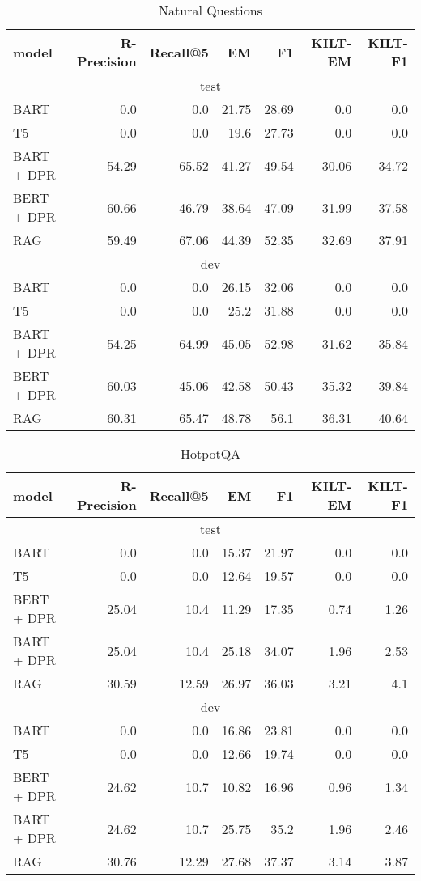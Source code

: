 \documentclass[11pt]{article}
\begin{document}
 \begin{table*}[ht]
\centering
\begin{tabular}{l@{\hskip 2em}rrrrrr}
 \toprule
model & \textbf{R-Precision} & \textbf{Recall@5} & \textbf{EM} & \textbf{F1}  & \textbf{KILT-EM}  & \textbf{KILT-F1}  \\
\midrule
\multicolumn{7}{c}{test} \\
\midrule
BART & 0.0 & 0.0 & 21.75 & 28.69 & 0.0 & 0.0 \\ 
T5 & 0.0 & 0.0 & 19.6 & 27.73 & 0.0 & 0.0 \\ 
BART + DPR & 54.29 & 65.52 & 41.27 & 49.54 & 30.06 & 34.72 \\ 
BERT + DPR & 60.66 & 46.79 & 38.64 & 47.09 & 31.99 & 37.58 \\ 
RAG & 59.49 & 67.06 & 44.39 & 52.35 & 32.69 & 37.91 \\  
\midrule
\multicolumn{7}{c}{dev} \\
\midrule
BART & 0.0 & 0.0 & 26.15 & 32.06 & 0.0 & 0.0 \\ 
T5 & 0.0 & 0.0 & 25.2 & 31.88 & 0.0 & 0.0 \\ 
BART + DPR & 54.25 & 64.99 & 45.05 & 52.98 & 31.62 & 35.84 \\ 
BERT + DPR & 60.03 & 45.06 & 42.58 & 50.43 & 35.32 & 39.84 \\ 
RAG & 60.31 & 65.47 & 48.78 & 56.1 & 36.31 & 40.64 \\  
\bottomrule
\end{tabular}
\caption{Natural Questions}
\label{tab:NQ}
\end{table*}
 \begin{table*}[ht]
\centering
\begin{tabular}{l@{\hskip 2em}rrrrrr}
 \toprule
model & \textbf{R-Precision} & \textbf{Recall@5} & \textbf{EM} & \textbf{F1}  & \textbf{KILT-EM}  & \textbf{KILT-F1}  \\
\midrule
\multicolumn{7}{c}{test} \\
\midrule
BART & 0.0 & 0.0 & 15.37 & 21.97 & 0.0 & 0.0 \\ 
T5 & 0.0 & 0.0 & 12.64 & 19.57 & 0.0 & 0.0 \\  
BERT + DPR & 25.04 & 10.4 & 11.29 & 17.35 & 0.74 & 1.26 \\ 
BART + DPR & 25.04 & 10.4 & 25.18 & 34.07 & 1.96 & 2.53 \\ 
RAG & 30.59 & 12.59 & 26.97 & 36.03 & 3.21 & 4.1 \\ 
\midrule
\multicolumn{7}{c}{dev} \\
\midrule
BART & 0.0 & 0.0 & 16.86 & 23.81 & 0.0 & 0.0 \\ 
T5 & 0.0 & 0.0 & 12.66 & 19.74 & 0.0 & 0.0 \\ 
BERT + DPR & 24.62 & 10.7 & 10.82 & 16.96 & 0.96 & 1.34 \\ 
BART + DPR & 24.62 & 10.7 & 25.75 & 35.2 & 1.96 & 2.46 \\ 
RAG & 30.76 & 12.29 & 27.68 & 37.37 & 3.14 & 3.87 \\  
\bottomrule
\end{tabular}
\caption{HotpotQA}
\label{tab:HotpotQA}
\end{table*}
\end{document}
